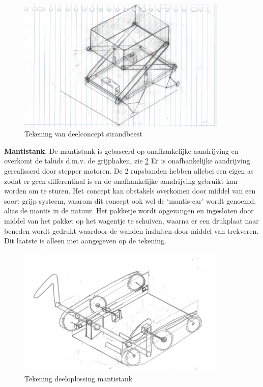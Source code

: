 \begin{figure}[t]
    \centering
    \includegraphics[width = 100mm]{04_idee_ontwikkeling/Deeloplossing_schaarlift,_Hilbert_(1).PNG}
    \caption{Tekening van deelconcept strandbeest}
    \label{schaarlift_hilbert}
\end{figure}

{\bf Mantistank}. 
De mantistank is gebaseerd op onafhankelijke aandrijving en overkomt de taluds d.m.v. de grijphaken, zie \cref{mantistank_max} Er is onafhankelijke aandrijving gerealisserd door stepper motoren. De 2 rupsbanden hebben allebei een eigen as zodat er geen differentiaal is en de onafhankelijke aandrijving gebruikt kan worden om te sturen. Het concept kan obstakels overkomen door middel van een soort grijp systeem, waarom dit concept ook wel de ‘mantis-car’ wordt genoemd, alias de mantis in de natuur. Het pakketje wordt opgevangen en ingesloten door middel van het pakket op het wagentje te schuiven, waarna er een drukplaat naar beneden wordt gedrukt waardoor de wanden insluiten door middel van trekveren. Dit laatste is alleen niet aangegeven op de tekening. \\
\vspace{\baselineskip}

\begin{figure}[H]
    \centering
    \includegraphics[width = 100mm]{04_idee_ontwikkeling/deelconcept_mantistank.JPG}
    \caption{Tekening deeloplossing mantistank}
    \label{mantistank_max}
\end{figure}

